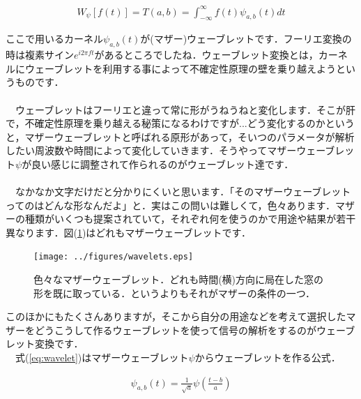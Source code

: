 \documentclass[11pt,a4paper]{ujreport} 	%
\begin{document}
\begin{eqnarray}
W_\psi[f(t)]  = T(a,b) = \int_{-\infty}^{\infty} f(t)\psi_{a,b}(t) dt
\label{eq:wavelet_transform}
\end{eqnarray}

ここで用いるカーネル$\psi_{a,b}(t)$が(マザー)ウェーブレットです．フーリエ変換の時は複素サイン$e^{i2\pi ft}$があるところでしたね．ウェーブレット変換とは，カーネルにウェーブレットを利用する事によって不確定性原理の壁を乗り越えようというものです．\\
\\
　ウェーブレットはフーリエと違って常に形がうねうねと変化します．そこが肝で，不確定性原理を乗り越える秘策になるわけですが...どう変化するのかというと，マザーウェーブレットと呼ばれる原形があって，そいつのパラメータが解析したい周波数や時間によって変化していきます．そうやってマザーウェーブレット$\psi$が良い感じに調整されて作られるのがウェーブレット達です．\\
\\
　なかなか文字だけだと分かりにくいと思います．「そのマザーウェーブレットってのはどんな形なんだよ」と．実はこの問いは難しくて，色々あります．マザーの種類がいくつも提案されていて，それぞれ何を使うのかで用途や結果が若干異なります．図(\ref{im:wavelets})はどれもマザーウェーブレットです．

\begin{figure}[H]
  \label{im:wavelets}
  \centering
  \texttt{[image: ../figures/wavelets.eps]}
  \caption{色々なマザーウェーブレット．どれも時間(横)方向に局在した窓の形を既に取っている．というよりもそれがマザーの条件の一つ．}
\end{figure}

このほかにもたくさんありますが，そこから自分の用途などを考えて選択したマザーをどうこうして作るウェーブレットを使って信号の解析をするのがウェーブレット変換です．\\
　式(\ref{eq:wavelet})はマザーウェーブレット$\psi$からウェーブレットを作る公式．

\begin{eqnarray}
\psi_{a,b}(t)  = \frac{1}{\sqrt{a}}\psi(\frac{t-b}{a})
\label{eq:wavelet}
\end{eqnarray}
\end{document}
